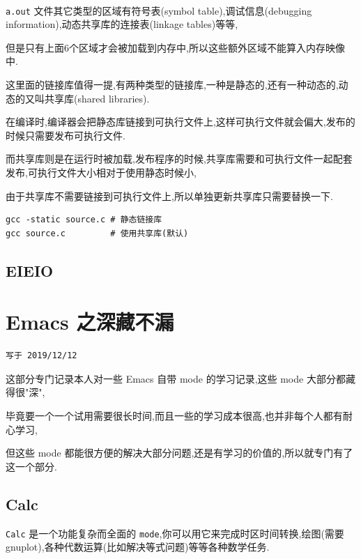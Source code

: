 \documentclass[11pt]{article}
\begin{document}
\\[0pt]


\texttt{a.out} 文件其它类型的区域有符号表(symbol table),调试信息(debugging information),动态共享库的连接表(linkage tables)等等,

但是只有上面6个区域才会被加载到内存中,所以这些额外区域不能算入内存映像中.

这里面的链接库值得一提,有两种类型的链接库,一种是静态的,还有一种动态的,动态的又叫共享库(shared libraries).

在编译时,编译器会把静态库链接到可执行文件上,这样可执行文件就会偏大,发布的时候只需要发布可执行文件.

而共享库则是在运行时被加载,发布程序的时候,共享库需要和可执行文件一起配套发布,可执行文件大小相对于使用静态时候小,

由于共享库不需要链接到可执行文件上,所以单独更新共享库只需要替换一下.

\begin{verbatim}
gcc -static source.c # 静态链接库
gcc source.c         # 使用共享库(默认)
\end{verbatim}


\subsection{EIEIO}
\label{sec:org06a2e32}

\section{Emacs 之深藏不漏}
\label{sec:org7340476}

\begin{verbatim}
写于 2019/12/12
\end{verbatim}

这部分专门记录本人对一些 Emacs 自带 mode 的学习记录,这些 mode 大部分都藏得很"深",

毕竟要一个一个试用需要很长时间,而且一些的学习成本很高,也并非每个人都有耐心学习,

但这些 mode 都能很方便的解决大部分问题,还是有学习的价值的,所以就专门有了这一个部分.

\subsection{Calc}
\label{sec:orgfc457b1}

\texttt{Calc} 是一个功能复杂而全面的 \texttt{mode},你可以用它来完成时区时间转换,绘图(需要gnuplot),各种代数运算(比如解决等式问题)等等各种数学任务.
\end{document}
